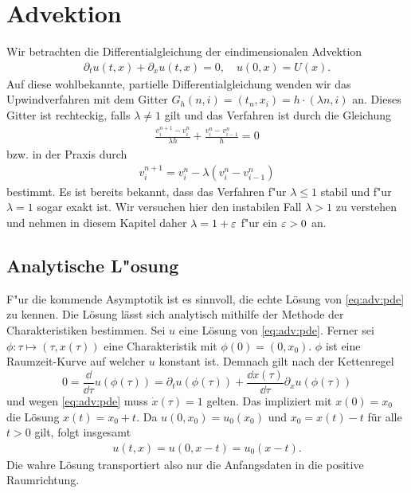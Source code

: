 \section{Advektion}

Wir betrachten die Differentialgleichung der eindimensionalen Advektion
\begin{align}\label{eq:adv:pde}
\partial_t u(t, x) + \partial_x u(t, x) = 0, \quad u(0, x) = U(x).
\end{align}
Auf diese wohlbekannte, partielle Differentialgleichung wenden wir das Upwindverfahren mit dem Gitter $G_h(n,i) = (t_n, x_i) = h \cdot (\lambda n, i)$ an.
Dieses Gitter ist rechteckig, falls $\lambda \neq 1$ gilt und das Verfahren ist durch die Gleichung
\begin{align}\label{eq:adv:scheme_rechnung}
\frac {v^{n+1}_i - v^n_i} {\lambda h} + \frac {v^n_i - v^n_{i-1}} h = 0
\end{align}
bzw. in der Praxis durch
\begin{align}\label{eq:adv:scheme}
v^{n+1}_i = v^n_i - \lambda (v^n_i - v^n_{i-1})
\end{align}
bestimmt.
Es ist bereits bekannt, dass das Verfahren f"ur $\lambda \leq 1$ stabil und f"ur $\lambda = 1$ sogar exakt ist.
Wir versuchen hier den instabilen Fall $\lambda > 1$ zu verstehen und nehmen in diesem Kapitel daher $\lambda = 1 + \varepsilon$ f"ur ein $\varepsilon > 0$ an.

\subsection {Analytische L"osung}

F"ur die kommende Asymptotik ist es sinnvoll, die echte Lösung von \eqref{eq:adv:pde} zu kennen.
Die Lösung lässt sich analytisch mithilfe der Methode der Charakteristiken bestimmen.
Sei $u$ eine Lösung von \eqref{eq:adv:pde}.
Ferner sei $\phi\colon \tau \mapsto (\tau, x(\tau))$ eine Charakteristik mit $\phi(0) = (0, x_0)$.
$\phi$ ist eine Raumzeit-Kurve auf welcher $u$ konstant ist.
Demnach gilt nach der Kettenregel
\[ 0 = \frac {\dd}{\dd \tau} u(\phi(\tau)) = \partial_t u(\phi(\tau))  + \frac {\dd x(\tau)} {\dd \tau} \partial_x u(\phi(\tau)) \]
und wegen \eqref{eq:adv:pde} muss $\dot x(\tau) = 1$ gelten.
Das impliziert mit $x(0) = x_0$ die Lösung $x(t) = x_0 + t$.
Da $u(0, x_0) = u_0(x_0)$ und $x_0 = x(t) - t$ für alle $t > 0$ gilt, folgt insgesamt
\begin{align}\label{eq:adv:solution}
u(t, x) = u(0, x - t) = u_0(x - t).
\end{align}
Die wahre Lösung transportiert also nur die Anfangsdaten in die positive Raumrichtung.


